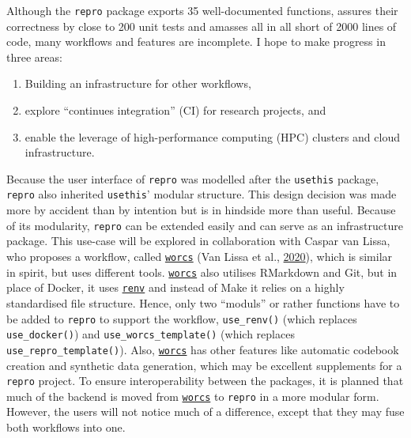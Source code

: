 \documentclass[12pt,a4paper,twoside]{article}
\providecommand{\tightlist}{%
  \setlength{\itemsep}{0pt}\setlength{\parskip}{0pt}}
\begin{document}
Although the \texttt{repro} package exports 35 well-documented functions, assures their correctness by close to 200 unit tests and amasses all in all short of 2000 lines of code, many workflows and features are incomplete.
I hope to make progress in three areas:

\begin{enumerate}
\def\labelenumi{\arabic{enumi}.}
\tightlist
\item
  Building an infrastructure for other workflows,
\item
  explore ``continues integration'' (CI) for research projects, and
\item
  enable the leverage of high-performance computing (HPC) clusters and cloud infrastructure.
\end{enumerate}

Because the user interface of \texttt{repro} was modelled after the \texttt{usethis} package, \texttt{repro} also inherited \texttt{usethis}' modular structure.
This design decision was made more by accident than by intention but is in hindside more than useful.
Because of its modularity, \texttt{repro} can be extended easily and can serve as an infrastructure package.
This use-case will be explored in collaboration with Caspar van Lissa, who proposes a workflow, called \href{https://cjvanlissa.github.io/worcs/}{\texttt{worcs}} (Van Lissa et al., \protect\hyperlink{ref-vanlissaWORCSWorkflowOpen2020}{2020}), which is similar in spirit, but uses different tools.
\href{https://cjvanlissa.github.io/worcs/}{\texttt{worcs}} also utilises RMarkdown and Git, but in place of Docker, it uses \href{https://rstudio.github.io/renv/articles/renv.html}{\texttt{renv}} and instead of Make it relies on a highly standardised file structure.
Hence, only two ``moduls'' or rather functions have to be added to \texttt{repro} to support the workflow, \texttt{use\_renv()} (which replaces \texttt{use\_docker()}) and \texttt{use\_worcs\_template()} (which replaces \texttt{use\_repro\_template()}).
Also, \href{https://cjvanlissa.github.io/worcs/}{\texttt{worcs}} has other features like automatic codebook creation and synthetic data generation, which may be excellent supplements for a \texttt{repro} project.
To ensure interoperability between the packages, it is planned that much of the backend is moved from \href{https://cjvanlissa.github.io/worcs/}{\texttt{worcs}} to \texttt{repro} in a more modular form.
However, the users will not notice much of a difference, except that they may fuse both workflows into one.
\end{document}
